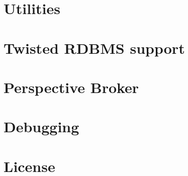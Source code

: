 \documentclass[twoside,letterpaper]{book}
\begin{document}
\chapter{Utilities}


\clearpage 
\clearpage 
\clearpage 
\clearpage 

\chapter{Twisted RDBMS support}



\chapter{Perspective Broker}

\clearpage 
\clearpage 
\clearpage 
\clearpage 

\appendix

\chapter{Debugging}



\chapter{License}


\end{document}
